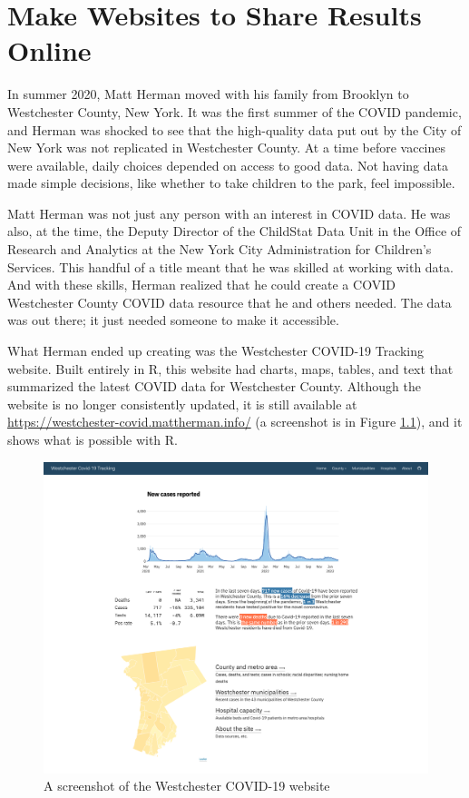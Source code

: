 \documentclass[
]{book}
\begin{document}
\hypertarget{websites-chapter}{%
\chapter{Make Websites to Share Results Online}\label{websites-chapter}}

In summer 2020, Matt Herman moved with his family from Brooklyn to Westchester County, New York. It was the first summer of the COVID pandemic, and Herman was shocked to see that the high-quality data put out by the City of New York was not replicated in Westchester County. At a time before vaccines were available, daily choices depended on access to good data. Not having data made simple decisions, like whether to take children to the park, feel impossible.

Matt Herman was not just any person with an interest in COVID data. He was also, at the time, the Deputy Director of the ChildStat Data Unit in the Office of Research and Analytics at the New York City Administration for Children's Services. This handful of a title meant that he was skilled at working with data. And with these skills, Herman realized that he could create a COVID Westchester County COVID data resource that he and others needed. The data was out there; it just needed someone to make it accessible.

What Herman ended up creating was the Westchester COVID-19 Tracking website. Built entirely in R, this website had charts, maps, tables, and text that summarized the latest COVID data for Westchester County. Although the website is no longer consistently updated, it is still available at \url{https://westchester-covid.mattherman.info/} (a screenshot is in Figure \ref{fig:westchester-website-screenshot}), and it shows what is possible with R.

\begin{figure}
\includegraphics[width=1\linewidth]{assets/westchester-website} \caption{A screenshot of the Westchester COVID-19 website}\label{fig:westchester-website-screenshot}
\end{figure}
\end{document}
